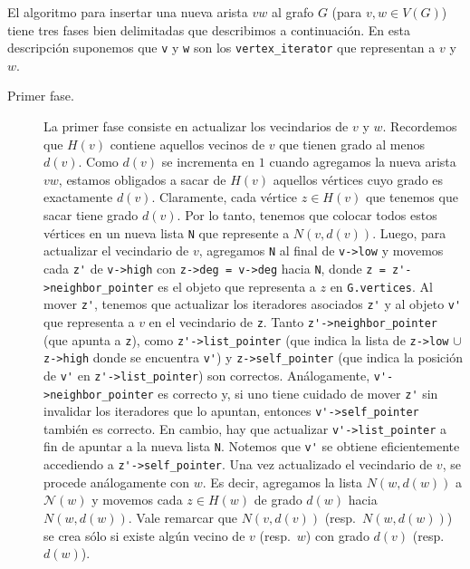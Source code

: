 \documentclass[%
    a4paper,%
    fontsize=12pt,%
    DIV=12,
    twoside,%
    openright,%
    titlepage=true,%
    headsepline,%
    toc=bibliography,%
    parskip=half,%
    cleardoublepage=empty,%
    headings=big,%
]{scrbook}
\makeatletter
\newcommand{\Code}[2][]{\lstinline[basicstyle={\ttfamily},#1]@#2@}
\newcommand{\N}{\mathcal{N}}
\makeatother
\begin{document}
El algoritmo para insertar una nueva arista $vw$ al grafo $G$ (para $v, w \in V(G)$) tiene tres fases bien delimitadas que describimos a continuación.  En esta descripción suponemos que \Code{v} y \Code{w} son los \Code{vertex_iterator} que representan a $v$ y $w$.
\begin{description}
\item [Primer fase.] La primer fase consiste en actualizar los vecindarios de $v$ y $w$.  Recordemos que $H(v)$ contiene aquellos vecinos de $v$ que tienen grado al menos $d(v)$.  Como $d(v)$ se incrementa en $1$ cuando agregamos la nueva arista $vw$, estamos obligados a sacar de $H(v)$ aquellos vértices cuyo grado es exactamente $d(v)$.  Claramente, cada vértice $z \in H(v)$ que tenemos que sacar tiene grado $d(v)$.  Por lo tanto, tenemos que colocar todos estos vértices en un nueva lista \Code{N} que represente a $N(v, d(v))$.  Luego, para actualizar el vecindario de $v$, agregamos \Code{N} al final de \Code{v->low} y movemos cada \Code{z'} de \Code{v->high} con \Code{z->deg = v->deg} hacia \Code{N}, donde \Code{z = z'->neighbor_pointer} es el objeto que representa a $z$ en \Code{G.vertices}. Al mover \Code{z'}, tenemos que actualizar los iteradores asociados \Code{z'} y al objeto \Code{v'} que representa a $v$ en el vecindario de \Code{z}.  Tanto \Code{z'->neighbor_pointer} (que apunta a \Code{z}), como \Code{z'->list_pointer} (que indica la lista de \Code{z->low} $\cup$ \Code{z->high} donde se encuentra \Code{v'}) y \Code{z->self_pointer} (que indica la posición de \Code{v'} en \Code{z'->list_pointer}) son correctos.  Análogamente, \Code{v'->neighbor_pointer} es correcto y, si uno tiene cuidado de mover \Code{z'} sin invalidar los iteradores que lo apuntan, entonces \Code{v'->self_pointer} también es correcto.  En cambio, hay que actualizar \Code{v'->list_pointer} a fin de apuntar a la nueva lista \Code{N}.  Notemos que \Code{v'} se obtiene eficientemente accediendo a \Code{z'->self_pointer}.  Una vez actualizado el vecindario de $v$, se procede análogamente con $w$.  Es decir, agregamos la lista $N(w, d(w))$ a $\N(w)$ y movemos cada $z \in H(w)$ de grado $d(w)$ hacia $N(w, d(w))$.  Vale remarcar que $N(v,d(v))$ (resp.\ $N(w, d(w))$) se crea sólo si existe algún vecino de $v$ (resp.\ $w$) con grado $d(v)$ (resp.\ $d(w)$).  


\end{description}
\end{document}
